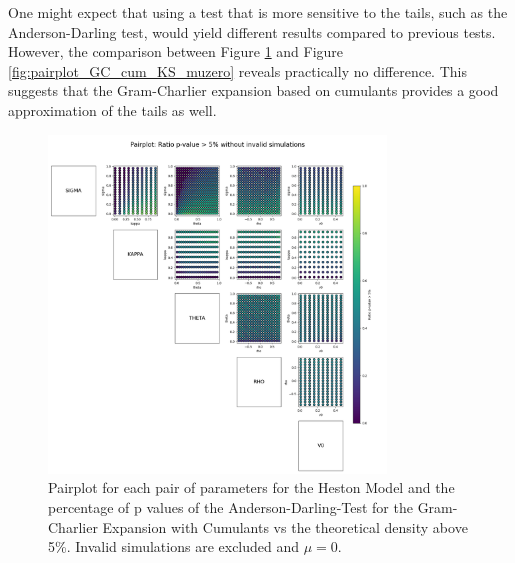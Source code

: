 One might expect that using a test that is more sensitive to the tails, such as the Anderson-Darling test, would yield different results compared to previous tests. However, the comparison between Figure \ref{fig:pairplot_GC_cum_AD_muzero} and Figure \ref{fig:pairplot_GC_cum_KS_muzero} reveals practically no difference. This suggests that the Gram-Charlier expansion based on cumulants provides a good approximation of the tails as well.

\begin{figure}
    \centering
    \includegraphics[width=0.8\textwidth]{img/pairplot_GC_cum_AD_muzero.png}
    \caption{Pairplot for each pair of parameters for the Heston Model and the percentage of p values of the Anderson-Darling-Test for the Gram-Charlier Expansion with Cumulants vs the theoretical density above 5\%. Invalid simulations are excluded and $\mu=0$.}
    \label{fig:pairplot_GC_cum_AD_muzero}
\end{figure}